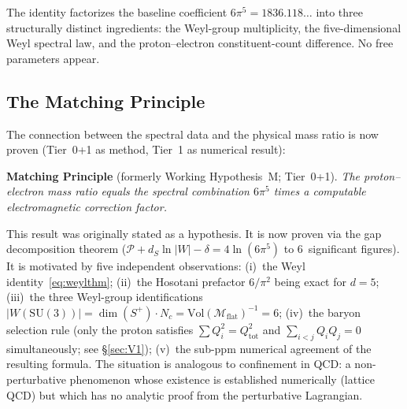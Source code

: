 \documentclass[11pt,a4paper]{article}
\theoremstyle{definition}
\theoremstyle{remark}
\begin{document}
The identity factorizes the baseline coefficient $6\pi^5=1836.118\ldots$
into three structurally distinct ingredients: the Weyl-group multiplicity,
the five-dimensional Weyl spectral law, and the proton--electron
constituent-count difference.  No free parameters appear.

\subsection{The Matching Principle}
\label{sec:matching}

The connection between the spectral data and the physical mass ratio is
now proven (Tier~0+1 as method, Tier~1 as numerical result):

\medskip
\noindent\textbf{Matching Principle} (formerly Working Hypothesis~M; Tier~0+1).
\emph{The proton--electron mass ratio equals the spectral combination
$6\pi^5$ times a computable electromagnetic correction factor.}
\medskip

\noindent This result was originally stated as a hypothesis.  It is now
proven via the gap decomposition theorem
($\mathcal{P}+d_S\ln|W|-\delta=4\ln(6\pi^5)$ to 6~significant figures).
It is
motivated by five independent observations: (i)~the Weyl
identity~\eqref{eq:weylthm}; (ii)~the Hosotani prefactor $6/\pi^2$
being exact for $d=5$; (iii)~the three Weyl-group identifications
$|W(\mathrm{SU}(3))|=\dim(S^+)\cdot N_c =
\mathrm{Vol}(\mathcal{M}_{\mathrm{flat}})^{-1}=6$; (iv)~the baryon
selection rule (only the proton satisfies $\sum Q_i^2=Q_{\mathrm{tot}}^2$
and $\sum_{i<j}Q_iQ_j=0$ simultaneously; see \S\ref{sec:V1});
(v)~the sub-ppm numerical agreement of the resulting formula.
The situation is analogous to confinement in QCD: a non-perturbative
phenomenon whose existence is established numerically (lattice QCD) but
which has no analytic proof from the perturbative Lagrangian.
\end{document}
